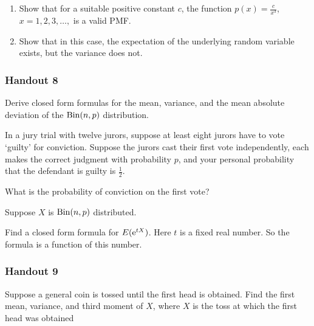 \begin{problem}[Handout 7, \# 8]
  \begin{enumerate}[label=(\alph*),noitemsep]
  \item Show that for a suitable positive constant \(c\), the function
    \(p(x)=\frac{c}{x^3}\), \(x=1,2,3,\dotsc,\) is a valid PMF.
  \item Show that in this case, the expectation of the underlying random
    variable exists, but the variance does not.
  \end{enumerate}
\end{problem}
\begin{solution*}
\end{solution*}

\subsubsection{Handout 8}
\begin{problem}[Handout 8, \# 4]
  Derive closed form formulas for the mean, variance, and the mean absolute
  deviation of the \(\operatorname{Bin}(n,p)\) distribution.
\end{problem}
\begin{solution*}
\end{solution*}

\begin{problem}[Handout 8, \# 6]
  In a jury trial with twelve jurors, suppose at least eight jurors have to
  vote `guilty' for conviction. Suppose the jurors cast their first vote
  independently, each makes the correct judgment with probability \(p\),
  and your personal probability that the defendant is guilty is
  \(\frac{1}{2}\).

  \noindent What is the probability of conviction on the first vote?
\end{problem}
\begin{solution*}
\end{solution*}

\begin{problem}[Handout 8, \# 11]
  Suppose \(X\) is \(\operatorname{Bin}(n,p)\) distributed.

  \noindent Find a closed form formula for \(E(\mathrm{e}^{tX})\). Here \(t\) is
  a fixed real number. So the formula is a function of this number.
\end{problem}
\begin{solution*}
\end{solution*}

\subsubsection{Handout 9}
\begin{problem}[Handout 9, \# 6]
  Suppose a general coin is tossed until the first head is obtained. Find
  the first mean, variance, and third moment of \(X\), where \(X\) is the
  toss at which the first head was obtained
\end{problem}
\begin{solution*}
\end{solution*}


